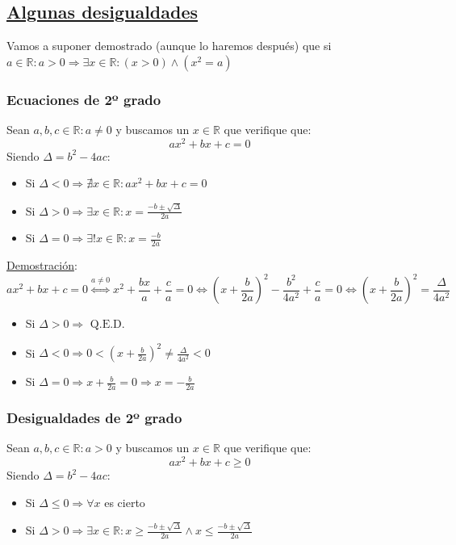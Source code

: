 \documentclass[10pt,a4paper,openright]{book}
\theoremstyle{break}
\begin{document}
\subsection{\underline{Algunas desigualdades}}
Vamos a suponer demostrado (aunque lo haremos después) que si $a\in \mathbb R : a>0\Rightarrow \exists x\in \mathbb R : (x>0)\wedge (x^2=a)$
\subsubsection{Ecuaciones de 2º grado}
Sean $a,b,c\in \mathbb R  : a\neq 0$ y buscamos un $x\in \mathbb R$ que verifique que:
$$ax^2+bx+c=0$$
Siendo $\Delta=b^2-4ac$:
\begin{itemize}
\item Si $\Delta<0\Rightarrow \nexists x\in \mathbb R : ax^2+bx+c=0$
\item Si $\Delta>0 \Rightarrow \exists x\in \mathbb R : x=\frac{-b\pm\sqrt{\Delta}}{2a}$
\item Si $\Delta=0 \Rightarrow \exists! x\in \mathbb R : x=\frac{-b}{2a}$
\end{itemize}

\underline{Demostración}:
$$ax^2+bx+c=0\stackrel{a\neq 0}{\Leftrightarrow} x^2+\frac{bx}{a}+\frac{c}{a}=0\Leftrightarrow (x+\frac{b}{2a})^2-\frac{b^2}{4a^2}+\frac{c}{a}=0\Leftrightarrow (x+\frac{b}{2a})^2=\frac{\Delta}{4a^2}$$
\begin{itemize}
\item Si $\Delta>0\Rightarrow \mbox{ Q.E.D.}$
\item Si $\Delta<0\Rightarrow 0<(x+\frac{b}{2a})^2 \neq \frac{\Delta}{4a^2}<0$
\item Si $\Delta=0\Rightarrow x+\frac{b}{2a}=0\Rightarrow x=-\frac{b}{2a}$
\end{itemize}

\subsubsection{Desigualdades de 2º grado}
Sean $a,b,c\in \mathbb R  : a>0$ y buscamos un $x\in \mathbb R$ que verifique que:
$$ax^2+bx+c\geq 0$$
Siendo $\Delta=b^2-4ac$:
\begin{itemize}
\item Si $\Delta\leq 0\Rightarrow \forall x$ es cierto
\item Si $\Delta>0 \Rightarrow \exists x \in \mathbb R : x\geq \frac{-b\pm\sqrt{\Delta}}{2a} \wedge x\leq \frac{-b\pm\sqrt{\Delta}}{2a}$
\end{itemize}
\end{document}
